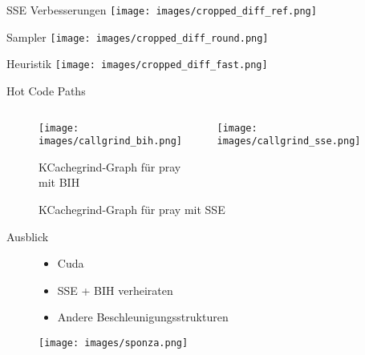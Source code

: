 	\begin{frame}{SSE Verbesserungen}
		\center
		\texttt{[image: images/cropped\_diff\_ref.png]}
	\end{frame}
	\begin{frame}{Sampler}
		\center
		\texttt{[image: images/cropped\_diff\_round.png]}
	\end{frame}
	\begin{frame}{Heuristik}
		\center
		\texttt{[image: images/cropped\_diff\_fast.png]}
	\end{frame}

	\begin{frame}{Hot Code Paths}
		\begin{figure}[ht]
			\begin{columns}
				\begin{column}{.48\textwidth}
					\center
					\texttt{[image: images/callgrind\_bih.png]}
					\caption{KCachegrind-Graph für pray mit BIH}
				\end{column}
				\begin{column}{.48\textwidth}
					\texttt{[image: images/callgrind\_sse.png]}
					\caption{KCachegrind-Graph für pray mit SSE}
				\end{column}
			\end{columns}
	\end{figure}
	\end{frame}

	\begin{frame}{Ausblick}
		\begin{figure}[ht]
		\vspace{1cm}
		\begin{minipage}{0.45\linewidth}
			\begin{itemize}
				\item Cuda
				\item SSE + BIH verheiraten
				\item Andere Beschleunigungsstrukturen
			\end{itemize}
			\vspace{4.5cm}
		\end{minipage}
		\begin{minipage}[b]{0.45\linewidth}
			\centering
			\texttt{[image: images/sponza.png]}
		\end{minipage}
	\end{figure}
		
	\end{frame}

